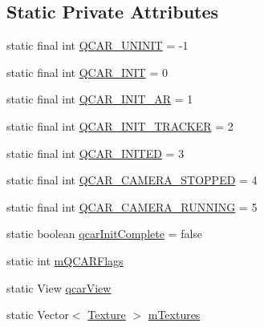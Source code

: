 \subsection*{\-Static \-Private \-Attributes}
\begin{DoxyCompactItemize}
\item 
static final int \hyperlink{classsrdes_1_1menupp_1_1_qcar_engine_acb32f3276ef00bb9e81c501a99439a6a}{\-Q\-C\-A\-R\-\_\-\-U\-N\-I\-N\-I\-T} = -\/1
\item 
static final int \hyperlink{classsrdes_1_1menupp_1_1_qcar_engine_a3eb1180e824f219137cc7014d70da839}{\-Q\-C\-A\-R\-\_\-\-I\-N\-I\-T} = 0
\item 
static final int \hyperlink{classsrdes_1_1menupp_1_1_qcar_engine_a421056638c40d64ea3f442220e701ac7}{\-Q\-C\-A\-R\-\_\-\-I\-N\-I\-T\-\_\-\-A\-R} = 1
\item 
static final int \hyperlink{classsrdes_1_1menupp_1_1_qcar_engine_a8ebe5c2707c7168d75f90b5575f6a6a7}{\-Q\-C\-A\-R\-\_\-\-I\-N\-I\-T\-\_\-\-T\-R\-A\-C\-K\-E\-R} = 2
\item 
static final int \hyperlink{classsrdes_1_1menupp_1_1_qcar_engine_ac7be6509e6d3ba8aa2714551ebe864de}{\-Q\-C\-A\-R\-\_\-\-I\-N\-I\-T\-E\-D} = 3
\item 
static final int \hyperlink{classsrdes_1_1menupp_1_1_qcar_engine_adef9fb73bbb25342a87683fc71ab9d8c}{\-Q\-C\-A\-R\-\_\-\-C\-A\-M\-E\-R\-A\-\_\-\-S\-T\-O\-P\-P\-E\-D} = 4
\item 
static final int \hyperlink{classsrdes_1_1menupp_1_1_qcar_engine_a84d969972de1a53d6e01db5b26b19d05}{\-Q\-C\-A\-R\-\_\-\-C\-A\-M\-E\-R\-A\-\_\-\-R\-U\-N\-N\-I\-N\-G} = 5
\item 
static boolean \hyperlink{classsrdes_1_1menupp_1_1_qcar_engine_aa1439e16a46c591bc3bb81f8e66d1081}{qcar\-Init\-Complete} = false
\item 
static int \hyperlink{classsrdes_1_1menupp_1_1_qcar_engine_a83f9dd29a6f069789a88cf32d3e8780f}{m\-Q\-C\-A\-R\-Flags}
\item 
static \-View \hyperlink{classsrdes_1_1menupp_1_1_qcar_engine_a6fb3d3ecf5930ac88dc3180f11b0fe1c}{qcar\-View}
\item 
static \-Vector$<$ \hyperlink{classsrdes_1_1menupp_1_1_texture}{\-Texture} $>$ \hyperlink{classsrdes_1_1menupp_1_1_qcar_engine_af544c90da4f0c9e7081c2c1054bc600e}{m\-Textures}
\end{DoxyCompactItemize}


